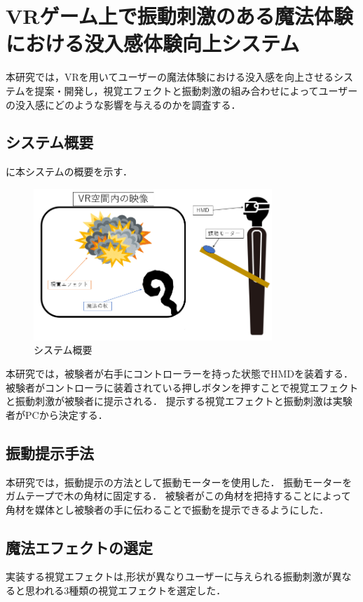 \chapter{VRゲーム上で振動刺激のある魔法体験における没入感体験向上システム}
本研究では，VRを用いてユーザーの魔法体験における没入感を向上させるシステムを提案・開発し，視覚エフェクトと振動刺激の組み合わせによってユーザーの没入感にどのような影響を与えるのかを調査する．






\section{システム概要}
に本システムの概要を示す．
\begin{figure}[h]
\centering
\includegraphics[clip,width=9cm]{./fig/allsystem.png}
\caption{システム概要}\label{allsystem}
\end{figure}

本研究では，被験者が右手にコントローラーを持った状態でHMDを装着する．
被験者がコントローラに装着されている押しボタンを押すことで視覚エフェクトと振動刺激が被験者に提示される．
提示する視覚エフェクトと振動刺激は実験者がPCから決定する．

\section{振動提示手法}
本研究では，振動提示の方法として振動モーターを使用した．
振動モーターをガムテープで木の角材に固定する．
被験者がこの角材を把持することによって角材を媒体とし被験者の手に伝わることで振動を提示できるようにした．

\section{魔法エフェクトの選定}
実装する視覚エフェクトは,形状が異なりユーザーに与えられる振動刺激が異なると思われる3種類の視覚エフェクトを選定した．

